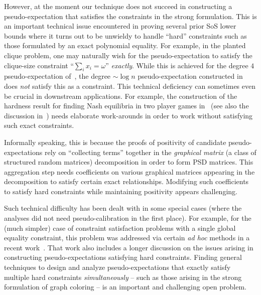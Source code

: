 However, at the moment our technique does not succeed in constructing a pseudo-expectation that satisfies the constraints in the strong formulation. This is an important technical issue encountered in proving several prior SoS lower bounds where it turns out to be unwieldy to handle ``hard'' constraints such as those formulated by an exact polynomial equality. For example, in the planted clique problem, one may naturally wish for the pseudo-expectation to satisfy the clique-size constraint ``$\sum_i x_i = \omega$'' \emph{exactly}. While this is achieved for the degree $4$ pseudo-expectation of~\cite{DBLP:journals/corr/HopkinsKP15,DBLP:journals/corr/RaghavendraS15}, the degree $\sim \log n$ pseudo-expectation constructed in~\cite{DBLP:conf/focs/BarakHKKMP16} does \emph{not} satisfy this as a constraint. This technical deficiency can sometimes even be crucial in downstream applications. For example, the construction of the hardness result for finding Nash equilibria in two player games in~\cite{DBLP:conf/stoc/KothariM18} (see also the discussion in~\cite{DBLP:journals/corr/abs-1809-01207}) needs elaborate work-arounds in order to work without satisfying such exact constraints. 

Informally speaking, this is because the proofs of positivity of candidate pseudo-expectations rely on ``collecting terms'' together in the \emph{graphical matrix} (a class of structured random matrices) decomposition in order to form PSD matrices. This aggregation step needs coefficients on various graphical matrices appearing in the decomposition to satisfy certain exact relationships. Modifying such coefficients to satisfy hard constraints while maintaining positivity appears challenging. 

Such technical difficulty has been dealt with in some special cases (where the analyses did not need pseudo-calibration in the first place). For example, for the (much simpler) case of constraint satisfaction problems with a single global equality constraint, this problem was addressed via certain \emph{ad hoc} methods in a recent work~\cite{DBLP:journals/corr/abs-1809-01207}. That work also includes a longer discussion on the issues arising in constructing pseudo-expectations satisfying hard constraints. Finding general techniques to design and analyze pseudo-expectations that exactly satisfy multiple hard constraints \emph{simultaneously} -- such as those arising in the strong formulation of graph coloring -- is an important and challenging open problem. 







